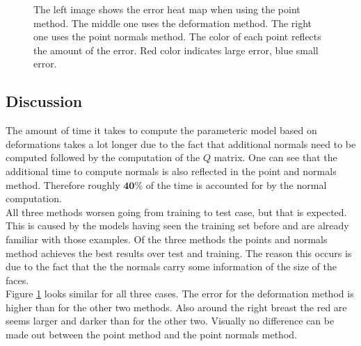 \begin{figure}
\centering
{}
\caption[Input Data for PCA error heat map]{The left image shows the error heat map when using the point method. The middle one uses the deformation method. The right one uses the point normals method. The color of each point reflects the amount of the error. Red color indicates large error, blue small error.}
\label{fig:PDNheatmap}
\end{figure}

\subsection{Discussion}
The amount of time it takes to compute the parameteric model based on deformations takes a lot longer due to the fact that additional normals need to be computed followed by the computation of the $Q$ matrix. One can see that the additional time to compute normals is also reflected in the point and normals method. Therefore roughly $\mathbf{40\%}$ of the time is accounted for by the normal computation.\\
All three methods worsen going from training to test case, but that is expected. This is caused by the models having seen the training set before and are already familiar with those examples. Of the three methods the points and normals method achieves the best results over test and training. The reason this occurs is due to the fact that the the normals carry some information of the size of the faces.\\
Figure \ref{fig:PDNheatmap} looks similar for all three cases. The error for the deformation method is higher than for the other two methods. Also around the right breast the red are seems larger and darker than for the other two. Visually no difference can be made out between the point method and the point normals method.

